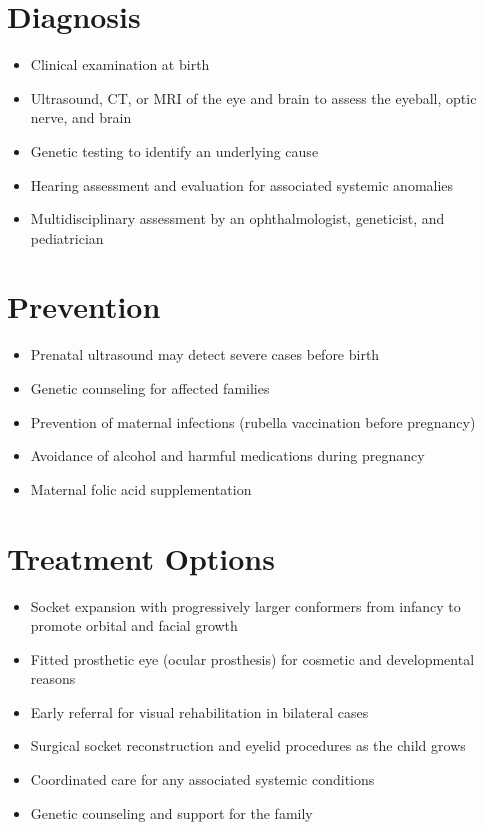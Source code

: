 \section{Diagnosis}
\begin{itemize}[noitemsep]
  \item Clinical examination at birth
  \item Ultrasound, CT, or MRI of the eye and brain to assess the eyeball, optic nerve, and brain
  \item Genetic testing to identify an underlying cause
  \item Hearing assessment and evaluation for associated systemic anomalies
  \item Multidisciplinary assessment by an ophthalmologist, geneticist, and pediatrician
\end{itemize}
\section{Prevention}
\begin{itemize}[noitemsep]
  \item Prenatal ultrasound may detect severe cases before birth
  \item Genetic counseling for affected families
  \item Prevention of maternal infections (rubella vaccination before pregnancy)
  \item Avoidance of alcohol and harmful medications during pregnancy
  \item Maternal folic acid supplementation
\end{itemize}
\section{Treatment Options}
\begin{itemize}[noitemsep]
  \item Socket expansion with progressively larger conformers from infancy to promote orbital and facial growth
  \item Fitted prosthetic eye (ocular prosthesis) for cosmetic and developmental reasons
  \item Early referral for visual rehabilitation in bilateral cases
  \item Surgical socket reconstruction and eyelid procedures as the child grows
  \item Coordinated care for any associated systemic conditions
  \item Genetic counseling and support for the family
\end{itemize}
